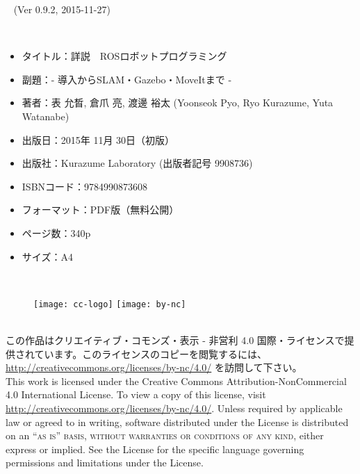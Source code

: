 \documentclass[11pt,fleqn]{book} %
\begin{document}
\begingroup
\thispagestyle{empty}

\centering
~\vfill
\large{(Ver 0.9.2, 2015-11-27)} \\ %
\endgroup

\newpage
\thispagestyle{empty}

\noindent{\LARGE [本の紹介]}\\
\normalsize
\begin{itemize}[leftmargin=*]
\item タイトル：詳説　ROSロボットプログラミング
\item 副題：- 導入からSLAM・Gazebo・MoveItまで -
\item 著者：表 允晳, 倉爪 亮, 渡邊 裕太 (Yoonseok Pyo, Ryo Kurazume, Yuta Watanabe)
\item 出版日：2015年 11月 30日（初版）
\item 出版社：Kurazume Laboratory (出版者記号 9908736)
\item ISBNコード：9784990873608
\item フォーマット：PDF版（無料公開）
\item ページ数：340p
\item サイズ：A4
\end{itemize}
\vspace*{1cm}


\noindent{\LARGE [ライセンス]}\\
\begin{figure}[htp]
\centering
\texttt{[image: cc-logo]}
\hspace{10pt}
\texttt{[image: by-nc]}
\end{figure}
\normalsize\\
\noindent この作品はクリエイティブ・コモンズ・表示 - 非営利 4.0 国際・ライセンスで提供されています。このライセンスのコピーを閲覧するには、 \url{http://creativecommons.org/licenses/by-nc/4.0/} を訪問して下さい。\\

\noindent This work is licensed under the Creative Commons Attribution-NonCommercial 4.0 International License. To view a copy of this license, visit \url{http://creativecommons.org/licenses/by-nc/4.0/}. Unless required by applicable law or agreed to in writing, software distributed under the License is distributed on an \textsc{``as is'' basis, without warranties or conditions of any kind}, either express or implied. See the License for the specific language governing permissions and limitations under the License.\\ %
\end{document}
